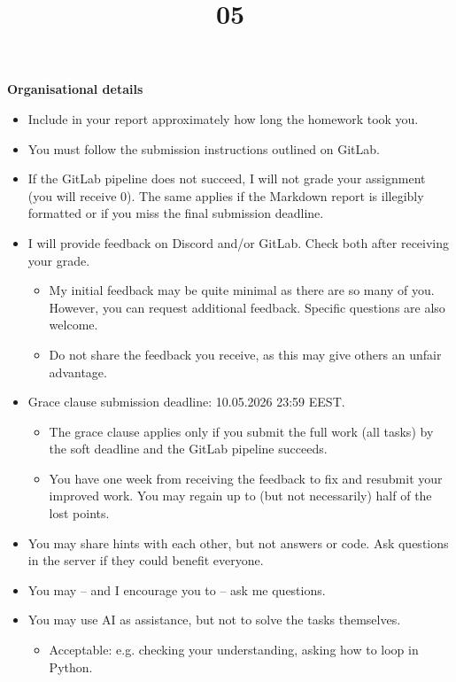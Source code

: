 \documentclass{homework}
\title{05}
\begin{document}
\maketitle

\textbf{Organisational details}

\begin{itemize}
  \item Include in your report approximately how long the homework took you.
  \item You must follow the submission instructions outlined on GitLab.
  \item If the GitLab pipeline does not succeed, I will not grade your assignment (you will receive 0).
  The same applies if the Markdown report is illegibly formatted or if you miss the final submission deadline.
  \item I will provide feedback on Discord and/or GitLab.
  Check both after receiving your grade.
  \begin{itemize}
    \item My initial feedback may be quite minimal as there are so many of you.
    However, you can request additional feedback.
    Specific questions are also welcome.
    \item Do not share the feedback you receive, as this may give others an unfair advantage.
  \end{itemize}
  \item Grace clause submission deadline: 10.05.2026 23:59 EEST.
  \begin{itemize}
    \item The grace clause applies only if you submit the full work (all tasks) by the soft deadline and the GitLab pipeline succeeds.
    \item You have one week from receiving the feedback to fix and resubmit your improved work.
    You may regain up to (but not necessarily) half of the lost points.
  \end{itemize}
  \item You may share hints with each other, but not answers or code.
  Ask questions in the server if they could benefit everyone.
  \item You may -- and I encourage you to -- ask me questions.
  \item You may use AI as assistance, but not to solve the tasks themselves.
  \begin{itemize}
    \item Acceptable: e.g. checking your understanding, asking how to loop in Python.

\end{itemize}
\end{itemize}
\end{document}
